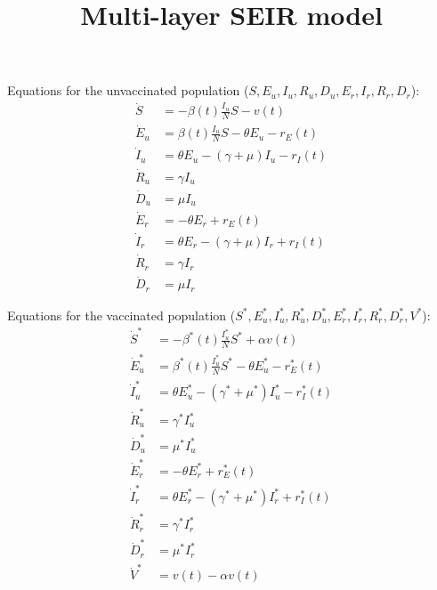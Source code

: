 \documentclass[11pt]{article} %
\title{Multi-layer SEIR model}
\begin{document}
\maketitle
\allowdisplaybreaks


\noindent
Equations for the unvaccinated population ($S, E_u, I_u, R_u, D_u, E_r, I_r, R_r, D_r$):
%
\begin{align}
\dot{S} &= -\beta(t) \frac{I_u}{N} S - v(t)  \\
\dot{E}_u &= \beta(t) \frac{I_u}{N} S - \theta E_u - r_E(t) \\
\dot{I}_u &= \theta E_u - (\gamma + \mu) I_u - r_I(t) \\
\dot{R}_u &= \gamma I_u \\
\dot{D}_u &= \mu I_u \\
\dot{E}_r &= - \theta E_r + r_E(t) \\
\dot{I}_r &= \theta E_r - (\gamma + \mu) I_r + r_I(t) \\
\dot{R}_r &= \gamma I_r \\
\dot{D}_r &= \mu I_r
\end{align}
%

\noindent
Equations for the vaccinated population ($S^*, E^*_u, I^*_u, R^*_u, D^*_u, E^*_r, I^*_r, R^*_r, D^*_r, V^*$):
%
\begin{align}
\dot{S}^* &= -\beta^*(t) \frac{I^*_u}{N} S^* + \alpha v(t)  \\
\dot{E}^*_u &= \beta^*(t) \frac{I^*_u}{N} S^* - \theta E^*_u - r^*_E(t) \\
\dot{I}^*_u &= \theta E^*_u - (\gamma^* + \mu^*) I^*_u - r^*_I(t) \\
\dot{R}^*_u &= \gamma^* I^*_u \\
\dot{D}^*_u &= \mu^* I^*_u \\
\dot{E}^*_r &= - \theta E^*_r + r^*_E(t) \\
\dot{I}^*_r &= \theta E^*_r - (\gamma^* + \mu^*) I^*_r + r^*_I(t) \\
\dot{R}^*_r &= \gamma^* I^*_r \\
\dot{D}^*_r &= \mu^* I^*_r \\
\dot{V}^* &= v(t) - \alpha v(t)
\end{align}
\end{document}
